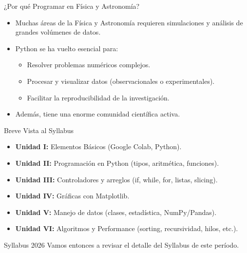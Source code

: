 \documentclass[10pt]{beamer}
\begin{document}
\begin{frame}{¿Por qué Programar en Física y Astronomía?}
  \begin{itemize}
    \item Muchas áreas de la Física y Astronomía requieren simulaciones y análisis de grandes volúmenes de datos.
    \item Python se ha vuelto esencial para:
      \begin{itemize}
        \item Resolver problemas numéricos complejos.
        \item Procesar y visualizar datos (observacionales o experimentales).
        \item Facilitar la reproducibilidad de la investigación.
      \end{itemize}
    \item Además, tiene una enorme comunidad científica activa.
  \end{itemize}
\end{frame}

\begin{frame}{Breve Vista al Syllabus}
  \begin{itemize}
    \item \textbf{Unidad I:} Elementos Básicos (Google Colab, Python).
    \item \textbf{Unidad II:} Programación en Python (tipos, aritmética, funciones).
    \item \textbf{Unidad III:} Controladores y arreglos (if, while, for, listas, slicing).
    \item \textbf{Unidad IV:} Gráficas con Matplotlib.
    \item \textbf{Unidad V:} Manejo de datos (clases, estadística, NumPy/Pandas).
    \item \textbf{Unidad VI:} Algoritmos y Performance (sorting, recursividad, hilos, etc.).
  \end{itemize}

\begin{block}{Syllabus 2026}
Vamos entonces a revisar el detalle del Syllabus de este período.
\end{block}
\end{frame}
\end{document}
